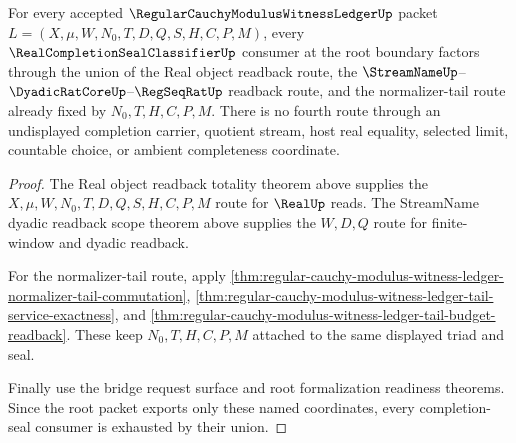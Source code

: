 \begin{theorem}
\label{thm:regular-cauchy-modulus-witness-ledger-completion-seal-root-consumer-exhaustion}
For every accepted $\RegularCauchyModulusWitnessLedgerUp$ packet $L=(X,\mu,W,N_0,T,D,Q,S,H,C,P,M)$, every $\RealCompletionSealClassifierUp$ consumer at the root boundary factors through the union of the Real object readback route, the $\StreamNameUp$--$\DyadicRatCoreUp$--$\RegSeqRatUp$ readback route, and the normalizer-tail route already fixed by $N_0,T,H,C,P,M$. There is no fourth route through an undisplayed completion carrier, quotient stream, host real equality, selected limit, countable choice, or ambient completeness coordinate.
\end{theorem}
\begin{proof}
The Real object readback totality theorem above supplies the $X,\mu,W,N_0,T,D,Q,S,H,C,P,M$ route for $\RealUp$ reads. The StreamName dyadic readback scope theorem above supplies the $W,D,Q$ route for finite-window and dyadic readback.

For the normalizer-tail route, apply \autoref{thm:regular-cauchy-modulus-witness-ledger-normalizer-tail-commutation}, \autoref{thm:regular-cauchy-modulus-witness-ledger-tail-service-exactness}, and \autoref{thm:regular-cauchy-modulus-witness-ledger-tail-budget-readback}. These keep $N_0,T,H,C,P,M$ attached to the same displayed triad and seal.

Finally use the bridge request surface and root formalization readiness theorems. Since the root packet exports only these named coordinates, every completion-seal consumer is exhausted by their union.
\end{proof}

